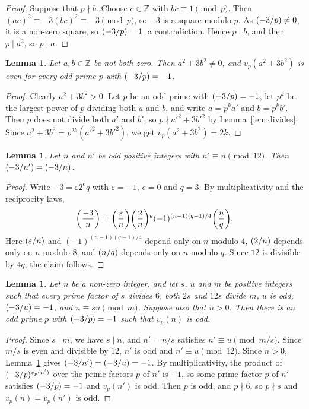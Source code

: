 \documentclass[11pt]{article}
\newtheorem{lemma}[theorem]{Lemma}
\newcommand{\Z}{\mathbb{Z}}
\newcommand{\leg}[2]{\mathchoice{\biggl(\dfrac{#1}{#2}\biggr)}{(#1/#2)}{(#1/#2)}{(#1/#2)}}
\begin{document}
\begin{proof}
Suppose that $p\nmid b$. Choose $c\in\Z$ with $bc\equiv1\pmod p$. Then $(ac)^2\equiv-3(bc)^2\equiv-3\pmod p$, so $-3$ is a square modulo $p$. As $\leg{-3}{p}\neq0$, it is a non-zero square, so $\leg{-3}{p}=1$, a contradiction. Hence $p\mid b$, and then $p\mid a^2$, so $p\mid a$.
\end{proof}

\begin{lemma}\label{lem:even}
Let $a,b\in\Z$ be not both zero. Then $a^2+3b^2\neq0$, and $v_p(a^2+3b^2)$ is even for every odd prime $p$ with $\leg{-3}{p}=-1$.
\end{lemma}

\begin{proof}
Clearly $a^2+3b^2>0$. Let $p$ be an odd prime with $\leg{-3}{p}=-1$, let $p^k$ be the largest power of $p$ dividing both $a$ and $b$, and write $a=p^ka'$ and $b=p^kb'$. Then $p$ does not divide both $a'$ and $b'$, so $p\nmid a'^2+3b'^2$ by Lemma~\ref{lem:divides}. Since $a^2+3b^2=p^{2k}(a'^2+3b'^2)$, we get $v_p(a^2+3b^2)=2k$.
\end{proof}

\begin{lemma}\label{lem:period}
Let $n$ and $n'$ be odd positive integers with $n'\equiv n\pmod{12}$. Then $\leg{-3}{n'}=\leg{-3}{n}$.
\end{lemma}

\begin{proof}
Write $-3=\varepsilon2^eq$ with $\varepsilon=-1$, $e=0$ and $q=3$. By multiplicativity and the reciprocity laws,
\[
\leg{-3}{n}=\leg{\varepsilon}{n}\leg{2}{n}^e(-1)^{(n-1)(q-1)/4}\leg{n}{q}.
\]
Here $\leg{\varepsilon}{n}$ and $(-1)^{(n-1)(q-1)/4}$ depend only on $n$ modulo $4$, $\leg{2}{n}$ depends only on $n$ modulo $8$, and $\leg{n}{q}$ depends only on $n$ modulo $q$. Since $12$ is divisible by $4q$, the claim follows.
\end{proof}

\begin{lemma}\label{lem:odd}
Let $n$ be a non-zero integer, and let $s$, $u$ and $m$ be positive integers such that every prime factor of $s$ divides $6$, both $2s$ and $12s$ divide $m$, $u$ is odd, $\leg{-3}{u}=-1$, and $n\equiv su\pmod m$. Suppose also that $n>0$. Then there is an odd prime $p$ with $\leg{-3}{p}=-1$ such that $v_p(n)$ is odd.
\end{lemma}

\begin{proof}
Since $s\mid m$, we have $s\mid n$, and $n'=n/s$ satisfies $n'\equiv u\pmod{m/s}$. Since $m/s$ is even and divisible by $12$, $n'$ is odd and $n'\equiv u\pmod{12}$. Since $n>0$, Lemma~\ref{lem:period} gives $\leg{-3}{n'}=\leg{-3}{u}=-1$. By multiplicativity, the product of $\leg{-3}{p}^{v_p(n')}$ over the prime factors $p$ of $n'$ is $-1$, so some prime factor $p$ of $n'$ satisfies $\leg{-3}{p}=-1$ and $v_p(n')$ is odd. Then $p$ is odd, and $p\nmid6$, so $p\nmid s$ and $v_p(n)=v_p(n')$ is odd.
\end{proof}
\end{document}
